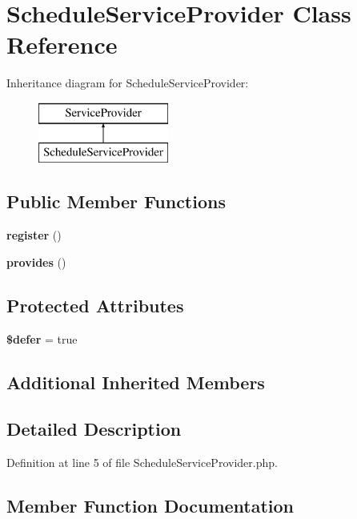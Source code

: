 \section{Schedule\+Service\+Provider Class Reference}
\label{class_illuminate_1_1_console_1_1_schedule_service_provider}
Inheritance diagram for Schedule\+Service\+Provider\+:\begin{figure}[H]
\begin{center}
\leavevmode
\includegraphics[height=2.000000cm]{class_illuminate_1_1_console_1_1_schedule_service_provider}
\end{center}
\end{figure}
\subsection*{Public Member Functions}
\begin{DoxyCompactItemize}
\item 
{\bf register} ()
\item 
{\bf provides} ()
\end{DoxyCompactItemize}
\subsection*{Protected Attributes}
\begin{DoxyCompactItemize}
\item 
{\bf \$defer} = true
\end{DoxyCompactItemize}
\subsection*{Additional Inherited Members}


\subsection{Detailed Description}


Definition at line 5 of file Schedule\+Service\+Provider.\+php.



\subsection{Member Function Documentation}
